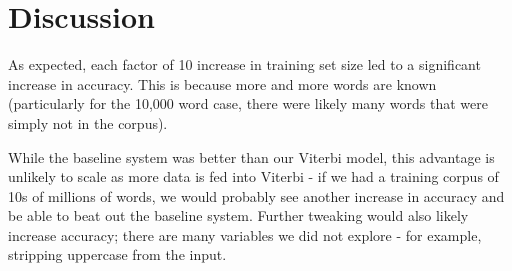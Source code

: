 \documentclass{article}
\begin{document}
\section{Discussion}

As expected, each factor of 10 increase in training set size led to a
significant increase in accuracy.  This is because more and more words are known
(particularly for the 10,000 word case, there were likely many words that were
simply not in the corpus).

While the baseline system was better than our Viterbi model, this advantage is
unlikely to scale as more data is fed into Viterbi - if we had a training corpus
of 10s of millions of words, we would probably see another increase in accuracy
and be able to beat out the baseline system.  Further tweaking would also likely
increase accuracy; there are many variables we did not explore - for example,
stripping uppercase from the input.
\end{document}
